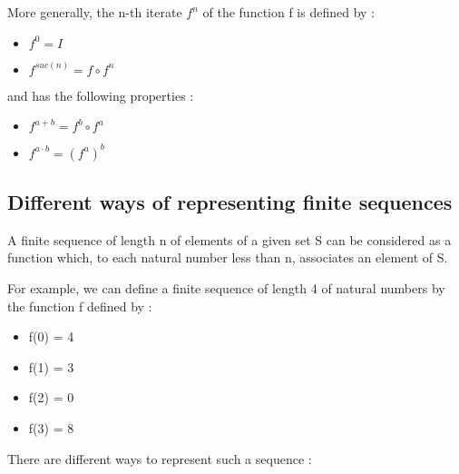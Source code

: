 \documentclass[10pt]{article}
\begin{document}
More generally, the n-th iterate \( f^n \) of the function f is defined by :

\begin{itemize}
     \setlength{\itemsep}{1pt}
     \setlength{\parskip}{0pt}
     \setlength{\parsep}{0pt}
\item \( f^0 = I \)
\item \( f^{suc(n)} = f \circ f^n \)
\end{itemize}

and has the following properties :

\begin{itemize}
     \setlength{\itemsep}{1pt}
     \setlength{\parskip}{0pt}
     \setlength{\parsep}{0pt}

\item \( f^{a+b} = f^b \circ f^a \)
\item \( f^{a \cdot b} = (f^a)^b \)

\end{itemize}

\subsection{Different ways of representing finite sequences}

A finite sequence of length n of elements of a given set S can be considered as a function which, to each natural number less than n, associates an element of S.

For example, we can define a finite sequence of length 4 of natural numbers by the function f defined by :

\begin{itemize}
     \setlength{\itemsep}{1pt}
     \setlength{\parskip}{0pt}
     \setlength{\parsep}{0pt}
\item f(0) = 4
\item f(1) = 3
\item f(2) = 0
\item f(3) = 8
\end{itemize}

There are different ways to represent such a sequence :
\end{document}
